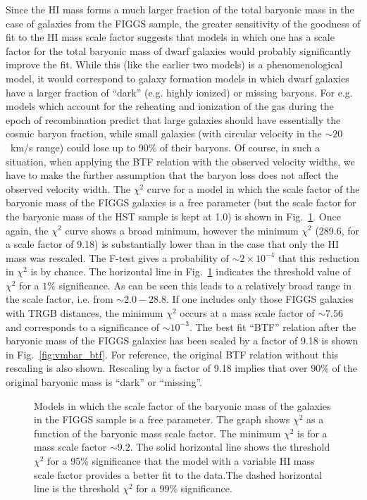 \documentclass[useAMS,usenatbib]{mn2e}
\begin{document}
    Since the HI mass forms a much larger fraction of the total baryonic mass in the case of galaxies from the FIGGS sample, the greater sensitivity of the goodness of fit to the HI mass scale factor suggests that models in which one has a scale factor for the total baryonic mass of dwarf galaxies would probably significantly improve the fit. While this (like the earlier two models) is a phenomenological model, it would correspond to galaxy formation models in which dwarf galaxies have a larger fraction of ``dark'' (e.g. highly ionized) or missing baryons. For e.g. models which account for the reheating and ionization of the gas during the epoch of recombination predict that large galaxies should have essentially the 
cosmic baryon fraction, while small galaxies (with circular velocity
in the $\sim 20$~km/s range) could lose up to 90\% of their baryons.
Of course, in such a situation, when applying the BTF relation with the observed velocity widths, we have to make the further assumption that the baryon loss does not affect the observed velocity width. The $\chi^2$ curve for a model in which the scale factor of the baryonic mass of the FIGGS galaxies is a free parameter (but the scale factor for the baryonic mass of the HST sample is kept at 1.0) is shown in Fig.~\ref{fig:mbar_scale}. Once again, the $\chi^2$ curve shows a broad minimum, however the minimum $\chi^2$ (289.6, for a scale factor of 9.18) is substantially lower than in the case that only the HI mass was rescaled. The F-test gives a probability of $\sim 2\times 10^{-4}$ that this reduction in $\chi^2$ is by chance.  The horizontal line in Fig.~\ref{fig:mbar_scale} indicates the threshold value of $\chi^2$ for a $1\%$ significance. As can be seen this leads to a relatively broad range in the scale factor, i.e. from $\sim 2.0 - 28.8$.
If one includes only those FIGGS galaxies with
TRGB distances, the minimum $\chi^2$ occurs at a mass scale factor
of $\sim 7.56$ and corresponds to a significance of $\sim 10^{-3}$.
The best fit ``BTF'' relation after the baryonic mass of the FIGGS galaxies has been scaled by a factor of 9.18 is shown in Fig.~\ref{fig:vmbar_btf}. For reference, the original BTF relation without this rescaling is also shown. Rescaling by a factor of 9.18 implies that over 90\% of the original baryonic mass is ``dark'' or ``missing''.

\begin{figure}
\caption{Models in which the scale factor of the baryonic mass of the galaxies in the FIGGS sample is a free parameter. The graph shows $\chi^2$ as a function of the baryonic mass scale factor. The minimum $\chi^2$ is for a mass scale factor $\sim 9.2$. The solid horizontal line shows the threshold $\chi^2$ for a 95\% significance that the model with a variable HI mass scale factor provides a better fit to the data.The dashed horizontal line is the threshold $\chi^2$ for a 99\% significance.}
\label{fig:mbar_scale}
\end{figure}
\end{document}
